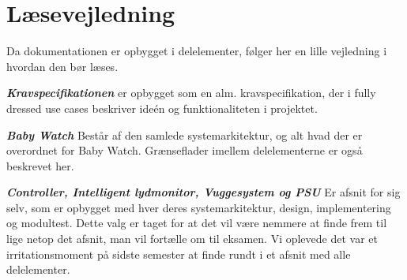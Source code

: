 \chapter{Læsevejledning}

Da dokumentationen er opbygget i delelementer, følger her en lille vejledning i hvordan den bør læses.

\textbf{\textit{Kravspecifikationen}} er opbygget som en alm. kravspecifikation, der i fully dressed use cases beskriver ideén og funktionaliteten i projektet.

\textbf{\textit{Baby Watch}} Består af den samlede systemarkitektur, og alt hvad der er overordnet for Baby Watch. Grænseflader imellem delelementerne er også beskrevet her.

\textbf{\textit{Controller, Intelligent lydmonitor, Vuggesystem og PSU}} Er afsnit for sig selv, som er opbygget med hver deres systemarkitektur, design, implementering og modultest. Dette valg er taget for at det vil være nemmere at finde frem til lige netop det afsnit, man vil fortælle om til eksamen. Vi oplevede det var et irritationsmoment på sidste semester at finde rundt i et afsnit med alle delelementer.